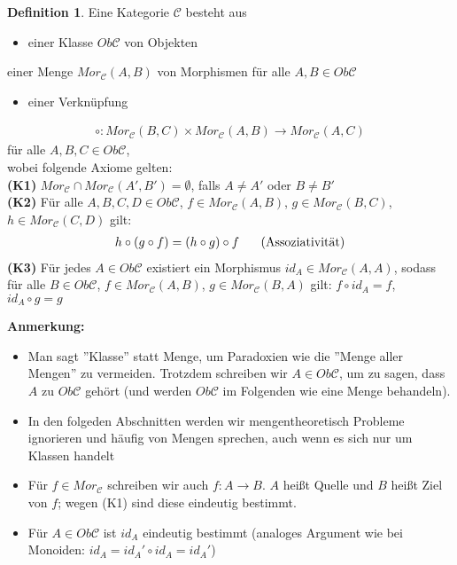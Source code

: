 \documentclass[10pt,a4paper,numbers=endperiod]{scrreprt}
\theoremstyle{definition}
\newtheorem{defi}[satz]{Definition}
\begin{document}
\begin{defi}
	Eine Kategorie $\mathcal{C}$ besteht aus \begin{itemize}
		\item einer Klasse $Ob \mathcal{C}$ von Objekten
	\end{itemize}
	einer Menge $Mor_{\mathcal{C}} (A,B)$ von Morphismen für alle $A, B \in Ob \mathcal{C}$ \begin{itemize}
		\item einer Verknüpfung
	\end{itemize}
	\begin{align*}
		\circ: Mor_{\mathcal{C}}(B,C) \times Mor_{\mathcal{C}} (A,B) \longrightarrow Mor_{\mathcal{C}} (A,C)	\end{align*}
	für alle $A, B, C \in Ob \mathcal{C}$,\\
	wobei folgende Axiome gelten:\\
	\textbf{(K1)} $Mor_{\mathcal{C}} \cap Mor_{\mathcal{C}} (A', B') = \emptyset$, falls $A \neq A'$ oder $B \neq B'$\\
	\textbf{(K2)} Für alle $A, B, C, D \in Ob \mathcal{C}$, $f \in Mor_{\mathcal{C}} (A, B)$, $g \in Mor_{\mathcal{C}} (B, C)$, $h \in Mor_{\mathcal{C}} (C, D)$ gilt:
	\begin{align*}
		h \circ (g \circ f) = (h \circ g) \circ f \hspace*{5mm} \text{ (Assoziativität)} 
	\end{align*}
	\textbf{(K3)} Für jedes $A \in Ob \mathcal{C}$ existiert ein Morphismus $id_A \in Mor_{\mathcal{C}}(A,A)$, sodass für alle $B \in Ob \mathcal{C}$, $f \in Mor_{\mathcal{C}} (A, B)$, $g \in Mor_{\mathcal{C}} (B,A)$ gilt: $f \circ id_A = f$, $id_A \circ g = g$
\end{defi}

\textbf{Anmerkung:} \begin{itemize}
	\item Man sagt ''Klasse'' statt Menge, um Paradoxien wie die ''Menge aller Mengen'' zu vermeiden. Trotzdem schreiben wir $A \in Ob \mathcal{C}$, um zu sagen, dass $A$ zu $Ob \mathcal{C}$ gehört (und werden $Ob \mathcal{C}$ im Folgenden wie eine Menge behandeln).
	\item In den folgeden Abschnitten werden wir mengentheoretisch Probleme ignorieren und häufig von Mengen sprechen, auch wenn es sich nur um Klassen handelt
	\item Für $f \in Mor_{\mathcal{C}}$ schreiben wir auch $f: A \rightarrow B$. $A$ heißt Quelle und $B$ heißt Ziel von $f$; wegen (K1) sind diese eindeutig bestimmt.
	\item Für $A \in Ob \mathcal{C}$ ist $id_A$ eindeutig bestimmt (analoges Argument wie bei Monoiden: $id_A = id_A' \circ id_A = id_A'$) 
\end{itemize}
\end{document}
